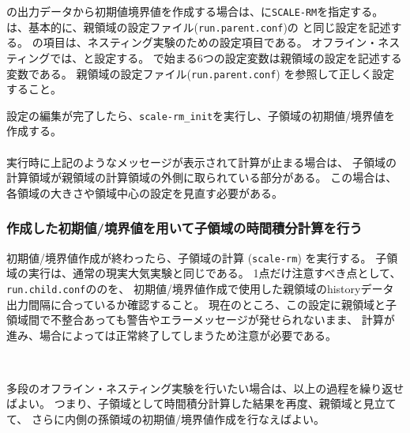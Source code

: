 \scalerm の出力データから初期値境界値を作成する場合は、に\verb|SCALE-RM|を指定する。
は、基本的に、親領域の設定ファイル(\verb|run.parent.conf|)の
と同じ設定を記述する。
%
の項目は、ネスティング実験のための設定項目である。
オフライン・ネスティングでは、と設定する。
 で始まる6つの設定変数は親領域の設定を記述する変数である。
親領域の設定ファイル(\verb|run.parent.conf|) を参照して正しく設定すること。


設定の編集が完了したら、\verb|scale-rm_init|を実行し、子領域の初期値/境界値を作成する。\\

\\

\noindent 実行時に上記のようなメッセージが表示されて計算が止まる場合は、
子領域の計算領域が親領域の計算領域の外側に取られている部分がある。
この場合は、各領域の大きさや領域中心の設定を見直す必要がある。


\subsubsection{作成した初期値/境界値を用いて子領域の時間積分計算を行う}
初期値/境界値作成が終わったら、子領域の計算 (\verb|scale-rm|) を実行する。
子領域の実行は、通常の現実大気実験と同じである。
1点だけ注意すべき点として、
\verb|run.child.conf|ののを、
初期値/境界値作成で使用した親領域のhistoryデータ出力間隔に合っているか確認すること。
現在のところ、この設定に親領域と子領域間で不整合あっても警告やエラーメッセージが発せられないまま、
計算が進み、場合によっては正常終了してしまうため注意が必要である。


\\

\noindent 

多段のオフライン・ネスティング実験を行いたい場合は、以上の過程を繰り返せばよい。
つまり、子領域として時間積分計算した結果を再度、親領域と見立てて、
さらに内側の孫領域の初期値/境界値作成を行なえばよい。


